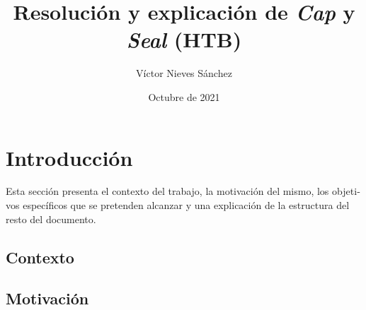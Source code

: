 \documentclass[a4paper, 12pt]{article} %
\author{Víctor Nieves Sánchez}
\date{Octubre de 2021}
\title{Resolución y explicación de \textit{Cap} y \textit{Seal} (\acrshort{HTB})}
\begin{document}
\maketitle
\null
\newpage
\begin{otherlanguage}{spanish}


    \begin{otherlanguage}{spanish}
        \renewcommand{\spanishabstractname}{Agradecimientos}
        \begin{abstract}
            
        \end{abstract}
    \end{otherlanguage}

    \newpage
    \tableofcontents

    \newpage
    \listoffigures



    \newpage
    \printglossary[type=\acronymtype]

    \newpage
    \begin{abstract}
        \normalsize
        
    \end{abstract}

    \newpage
    \renewcommand{\spanishabstractname}{Abstract}
    \begin{abstract}
        \normalsize
        
    \end{abstract}
    \newpage

    \section{Introducción}
    Esta sección presenta el contexto del trabajo, la motivación del mismo, los objetivos específicos que se pretenden alcanzar y una explicación de la estructura del resto del documento.
    \subsection{Contexto}
    

    \subsection{Motivación}
    


\end{otherlanguage}
\end{document}

